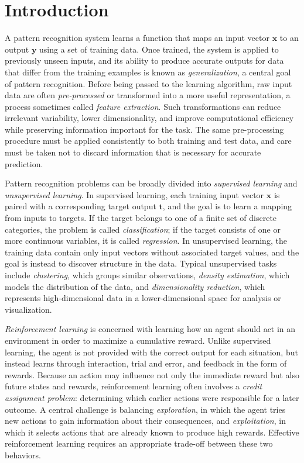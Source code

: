 \documentclass[10pt,twocolumn]{memoir}
\begin{document}
\chapter{Introduction}
\label{ch:introduction}

A pattern recognition system learns a function that maps an input vector $\mathbf{x}$ to an output $\mathbf{y}$ using a set of training data. Once trained, the system is applied to previously unseen inputs, and its ability to produce accurate outputs for data that differ from the training examples is known as \textit{generalization}, a central goal of pattern recognition. Before being passed to the learning algorithm, raw input data are often \textit{pre-processed} or transformed into a more useful representation, a process sometimes called \textit{feature extraction}. Such transformations can reduce irrelevant variability, lower dimensionality, and improve computational efficiency while preserving information important for the task. The same pre-processing procedure must be applied consistently to both training and test data, and care must be taken not to discard information that is necessary for accurate prediction.

Pattern recognition problems can be broadly divided into \textit{supervised learning} and \textit{unsupervised learning}. In supervised learning, each training input vector $\mathbf{x}$ is paired with a corresponding target output $\mathbf{t}$, and the goal is to learn a mapping from inputs to targets. If the target belongs to one of a finite set of discrete categories, the problem is called \textit{classification}; if the target consists of one or more continuous variables, it is called \textit{regression}. In unsupervised learning, the training data contain only input vectors without associated target values, and the goal is instead to discover structure in the data. Typical unsupervised tasks include \textit{clustering}, which groups similar observations, \textit{density estimation}, which models the distribution of the data, and \textit{dimensionality reduction}, which represents high-dimensional data in a lower-dimensional space for analysis or visualization.

\textit{Reinforcement learning} is concerned with learning how an agent should act in an environment in order to maximize a cumulative reward. Unlike supervised learning, the agent is not provided with the correct output for each situation, but instead learns through interaction, trial and error, and feedback in the form of rewards. Because an action may influence not only the immediate reward but also future states and rewards, reinforcement learning often involves a \textit{credit assignment problem}: determining which earlier actions were responsible for a later outcome. A central challenge is balancing \textit{exploration}, in which the agent tries new actions to gain information about their consequences, and \textit{exploitation}, in which it selects actions that are already known to produce high rewards. Effective reinforcement learning requires an appropriate trade-off between these two behaviors.
\end{document}
